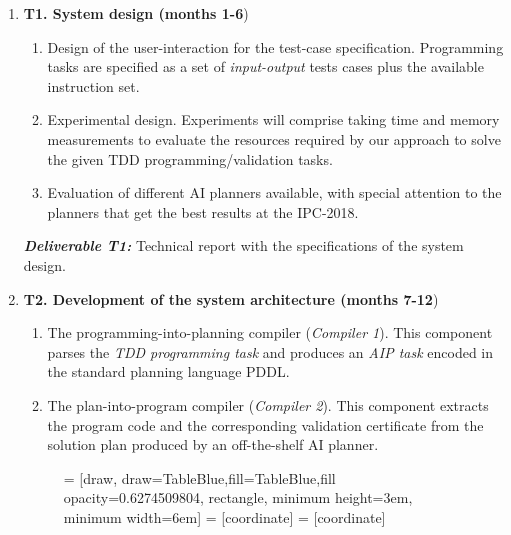 \documentclass[10pt,a4paper]{paper}
\begin{document}
\begin{enumerate}
\item {\bf T1. System design (months 1-6})
  \begin{small}
    \begin{enumerate}
    \item Design of the user-interaction for the test-case specification. Programming tasks are specified as a set of {\em input-output} tests cases plus the available instruction set. 
    \item Experimental design. Experiments will comprise taking time and memory measurements to evaluate the resources required by our approach to solve the given TDD programming/validation tasks.
      \item Evaluation of different AI planners available, with special attention to the planners that get the best results at the IPC-2018. 
      \end{enumerate}
  \end{small}

{\small{\bf\em  Deliverable T1:} Technical report with the specifications of the system design.}
  
  \item {\bf T2. Development of the system architecture (months 7-12})
    \begin{small}
      \begin{enumerate}
      \item The programming-into-planning compiler ({\em Compiler 1}). This component parses the {\em TDD programming task} and produces an {\em AIP task} encoded in the standard planning language PDDL.
      \item The plan-into-program compiler ({\em Compiler 2}). This component extracts the program code and the corresponding validation certificate from the solution plan produced by an off-the-shelf AI planner.
      \end{enumerate}
\end{small}      

\begin{figure}[hbt!]
 = [draw, draw=TableBlue,fill=TableBlue,fill opacity=0.6274509804, rectangle, minimum height=3em, minimum width=6em]
 = [coordinate]
 = [coordinate]
\begin{center}
\end{center}
\end{figure}
\end{enumerate}
\end{document}
